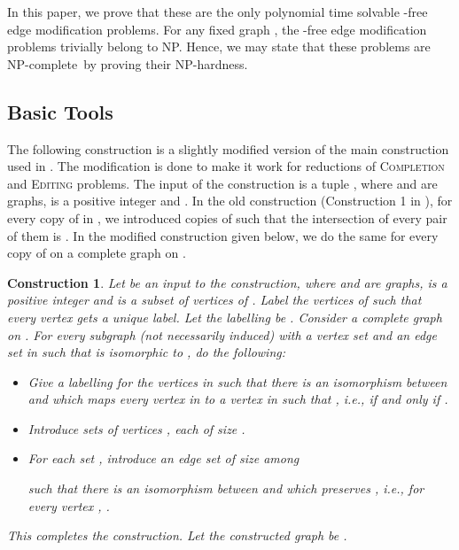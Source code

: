 \documentclass[envcountsame,envcountsect,10pt,oribibl]{llncs}
\newcommand{\cclass}[1]{\textnormal{\textsf{#1}}}
\newcommand{\NP}{\cclass{NP}}
\newcommand{\NPC}{\cclass{NP-complete}}
\newtheorem{construction}{Construction}
\begin{document}
In this paper, we prove that these are the only polynomial time solvable 
-free edge modification problems.
For any fixed graph , the -free edge modification problems trivially belong to \NP. Hence, we may 
state that these problems are \NPC\ by proving their NP-hardness.
\subsection{Basic Tools}

The following construction is a slightly modified version of the main 
construction used in \cite{DBLP:conf/cocoa/AravindSS15}.
The modification is done to make it work for reductions of \textsc{Completion}
and \textsc{Editing} problems. 
The input of the construction is a tuple , where  and  are
graphs,  is a positive integer and . In the old construction
(Construction 1 in \cite{DBLP:conf/cocoa/AravindSS15}), for every copy  of 
in , we introduced  copies of  such that the intersection of every pair
of them is . In the modified construction given below, we do the same for every copy 
of  on a complete graph on . 



\begin{construction}
  \label{con:nonadj}
  Let  be an input to the construction, where  and  are graphs, 
  is a positive integer and  is a subset of vertices of .
  Label the vertices of  such that every vertex gets a unique label. Let the labelling be .
  Consider a complete graph  on . 
  For every subgraph (not necessarily induced)  with a vertex set  
  and an edge set  in  such that  is isomorphic to ,
  do the following:
  \begin{itemize}
    \item Give a labelling  for the vertices in  such that there is an isomorphism
       between  and  which maps every vertex  in  to a vertex  in 
      such that , i.e.,  if and only if .
    \item Introduce  sets of vertices , each of size .
    \item For each set , introduce an edge set  of size  among
      
       such that there is an isomorphism  between  and
       which preserves , i.e.,
      for every vertex , .
  \end{itemize}
  This completes the construction. Let the constructed graph be . 
\end{construction}
\end{document}
